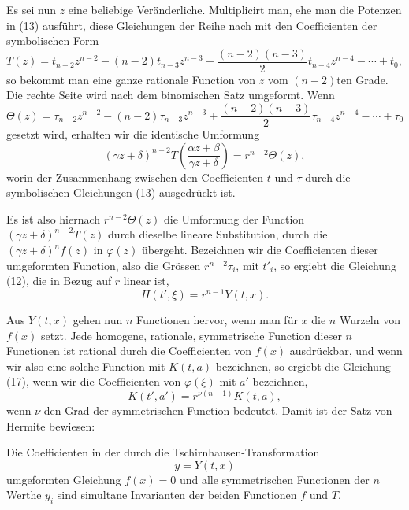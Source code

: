 \documentclass[11pt]{article}
\begin{document}
Es sei nun $z$ eine beliebige Veränderliche. Multiplicirt man, ehe man die Potenzen in (13) ausführt, diese Gleichungen der Reihe nach mit den Coefficienten der symbolischen Form
\begin{equation}
 T(z)=t_{n-2}z^{n-2}-(n-2)t_{n-3}z^{n-3}+\frac{(n-2)(n-3)}{2}t_{n-4}z^{n-4}-\cdots+t_0,
\tag{14}
\end{equation}
so bekommt man eine ganze rationale Function von $z$ vom $(n-2)$ten Grade. Die rechte Seite wird nach dem binomischen Satz umgeformt. Wenn
\begin{equation}
 \Theta(z)=\tau_{n-2}z^{n-2}-(n-2)\tau_{n-3}z^{n-3}+\frac{(n-2)(n-3)}2\tau_{n-4}z^{n-4}-\cdots+\tau_0
\tag{15}
\end{equation}
gesetzt wird, erhalten wir die identische Umformung
\begin{equation}
 (\gamma z+\delta)^{n-2}T\!\left(\frac{\alpha z+\beta}{\gamma z+\delta}\right)=r^{n-2}\Theta(z),
\tag{16}
\end{equation}
worin der Zusammenhang zwischen den Coefficienten $t$ und $\tau$ durch die symbolischen Gleichungen (13) ausgedrückt ist.

Es ist also hiernach $r^{n-2}\Theta(z)$ die Umformung der Function $(\gamma z+\delta)^{n-2}T(z)$ durch dieselbe lineare Substitution, durch die $(\gamma z+\delta)^nf(z)$ in $\varphi(z)$ übergeht. Bezeichnen wir die Coefficienten dieser umgeformten Function, also die Grössen $r^{n-2}\tau_i$, mit $t'_i$, so ergiebt die Gleichung (12), die in Bezug auf $r$ linear ist,
\begin{equation}
 H(t',\xi)=r^{n-1}Y(t,x).
\tag{17}
\end{equation}

Aus $Y(t,x)$ gehen nun $n$ Functionen hervor, wenn man für $x$ die $n$ Wurzeln von $f(x)$ setzt. Jede homogene, rationale, symmetrische Function dieser $n$ Functionen ist rational durch die Coefficienten von $f(x)$ ausdrückbar, und wenn wir also eine solche Function mit $K(t,a)$ bezeichnen, so ergiebt die Gleichung (17), wenn wir die Coefficienten von $\varphi(\xi)$ mit $a'$ bezeichnen,
\begin{equation}
 K(t',a')=r^{\nu(n-1)}K(t,a),
\tag{18}
\end{equation}
wenn $\nu$ den Grad der symmetrischen Function bedeutet. Damit ist der Satz von Hermite bewiesen:

Die Coefficienten in der durch die Tschirnhausen-Transformation
\[
 y=Y(t,x)
\]
umgeformten Gleichung $f(x)=0$ und alle symmetrischen Functionen der $n$ Werthe $y_i$ sind simultane Invarianten der beiden Functionen $f$ und $T$.
\end{document}
